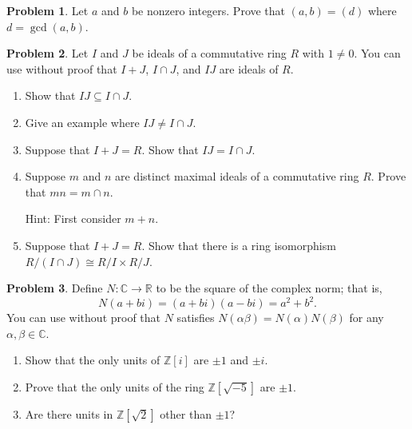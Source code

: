 \documentclass[11pt]{article}
\newcommand{\C}{\mathbb{C}}
\newcommand{\R}{\mathbb{R}}
\newcommand{\ZZ}{\mathbb{Z}}
\theoremstyle{definition}
\newtheorem{problem}{Problem}
\begin{document}
  


\begin{problem}
Let $a$ and $b$ be nonzero integers. Prove that $(a,b)=(d)$ where $d=\gcd(a,b)$.
\end{problem}



\begin{problem}
Let $I$ and $J$ be ideals of a commutative ring $R$ with $1 \neq 0$. 
You can use without proof that $I+J$, $I \cap J$, and $IJ$ are ideals of $R$.

\begin{enumerate}[label=(3.\arabic*), itemsep=-0.1em]
\vspace{-0.1em}
\item Show that $IJ \subseteq I \cap J$.

\item Give an example where $IJ \neq I \cap J$.

\item Suppose that $I + J = R$. Show that $IJ = I \cap J$.


\item Suppose $m$ and $n$ are distinct maximal ideals of a commutative ring $R$.  Prove that $mn=m\cap n$. 

\noindent
Hint: First consider $m + n$.


\item Suppose that $I + J = R$. Show that there is a ring isomorphism $R/(I\cap J) \cong  R/I\times R/J$. 

\end{enumerate}
\end{problem}




\begin{problem}
Define $N\!: \C \to \R$ to be the square of the complex norm; that is,  
$$N(a+bi) = (a+bi)(a-bi) = a^2+b^2.$$
You can use without proof that $N$ satisfies $N(\alpha \beta)=N(\alpha)N(\beta)$ for any $\alpha, \beta \in \C$.

\begin{enumerate}[label=(4.\arabic*),itemsep=0.1em]
\vspace{-0.5em}
\item Show that the only units of $\ZZ[i]$ are $\pm 1$ and $\pm i$.

\item Prove that the only units of the ring $\ZZ[\sqrt{-5}]$ are $\pm 1$.
  
\item Are there units in $\ZZ[\sqrt{2}]$ other than $\pm 1$? 
\end{enumerate}
\end{problem}
\end{document}
